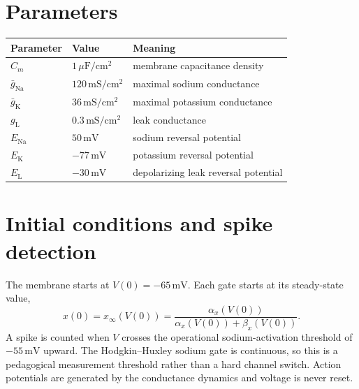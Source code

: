\documentclass[11pt,a4paper]{article}
\begin{document}
\section*{Parameters}
\begin{center}
\begin{tabular}{lll}
\toprule
Parameter & Value & Meaning\\
\midrule
$C_m$ & $1\,\mu\mathrm{F}/\mathrm{cm}^2$ & membrane capacitance density\\
$\bar g_{\mathrm{Na}}$ & $120\,\mathrm{mS}/\mathrm{cm}^2$ & maximal sodium conductance\\
$\bar g_{\mathrm{K}}$ & $36\,\mathrm{mS}/\mathrm{cm}^2$ & maximal potassium conductance\\
$g_{\mathrm{L}}$ & $0.3\,\mathrm{mS}/\mathrm{cm}^2$ & leak conductance\\
$E_{\mathrm{Na}}$ & $50\,\mathrm{mV}$ & sodium reversal potential\\
$E_{\mathrm{K}}$ & $-77\,\mathrm{mV}$ & potassium reversal potential\\
$E_{\mathrm{L}}$ & $-30\,\mathrm{mV}$ & depolarizing leak reversal potential\\
\bottomrule
\end{tabular}
\end{center}

\section*{Initial conditions and spike detection}
The membrane starts at $V(0)=-65\,\mathrm{mV}$. Each gate starts at its
steady-state value,
\begin{equation}
x(0)=x_\infty(V(0))=\frac{\alpha_x(V(0))}
{\alpha_x(V(0))+\beta_x(V(0))}.
\end{equation}
A spike is counted when $V$ crosses the operational sodium-activation threshold
of $-55\,\mathrm{mV}$ upward. The Hodgkin--Huxley sodium gate is continuous, so
this is a pedagogical measurement threshold rather than a hard channel switch.
Action potentials are generated by the conductance dynamics and voltage is
never reset.
\end{document}
